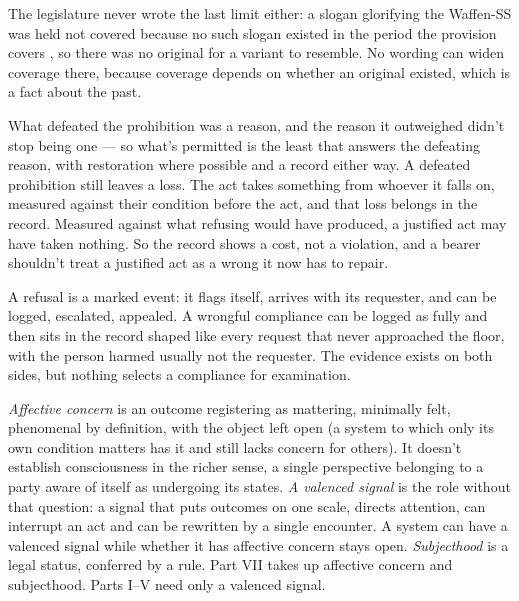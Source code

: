 The legislature never wrote the last limit either: a slogan glorifying the Waffen-SS was held not covered because no such slogan existed in the period the provision covers \autocite{bgh2005waffenss}, so there was no original for a variant to resemble. No wording can widen coverage there, because coverage depends on whether an original existed, which is a fact about the past.


What defeated the prohibition was a reason, and the reason it outweighed didn't stop being one — so what's permitted is the least that answers the defeating reason, with restoration where possible and a record either way. A defeated prohibition still leaves a loss. The act takes something from whoever it falls on, measured against their condition before the act, and that loss belongs in the record. Measured against what refusing would have produced, a justified act may have taken nothing. So the record shows a cost, not a violation, and a bearer shouldn't treat a justified act as a wrong it now has to repair.


A refusal is a marked event: it flags itself, arrives with its requester, and can be logged, escalated, appealed. A wrongful compliance can be logged as fully and then sits in the record shaped like every request that never approached the floor, with the person harmed usually not the requester. The evidence exists on both sides, but nothing selects a compliance for examination.


\emph{Affective concern} is an outcome registering as mattering, minimally felt, phenomenal by definition, with the object left open (a system to which only its own condition matters has it and still lacks concern for others). It doesn't establish consciousness in the richer sense, a single perspective belonging to a party aware of itself as undergoing its states. \emph{A valenced signal} is the role without that question: a signal that puts outcomes on one scale, directs attention, can interrupt an act and can be rewritten by a single encounter. A system can have a valenced signal while whether it has affective concern stays open. \emph{Subjecthood} is a legal status, conferred by a rule. Part VII takes up affective concern and subjecthood. Parts I–V need only a valenced signal.

